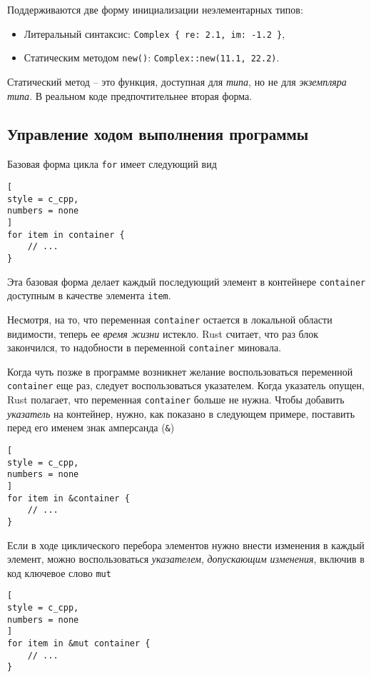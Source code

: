 \documentclass[%
	11pt,
	a4paper,
	utf8,
		]{article}
\begin{document}
Поддерживаются две форму инициализации неэлементарных типов:
\begin{itemize}
	\item Литеральный синтаксис: \verb|Complex { re: 2.1, im: -1.2 }|,
	
	\item Статическим методом \verb|new()|: \verb|Complex::new(11.1, 22.2)|.
\end{itemize}

Статический метод -- это функция, доступная для \emph{типа}, но не для \emph{экземпляра типа}. В реальном коде предпочтительнее вторая форма.

\subsection{Управление ходом выполнения программы}

Базовая форма цикла \texttt{for} имеет следующий вид
\begin{lstlisting}[
style = c_cpp,
numbers = none
]
for item in container {
    // ...
}
\end{lstlisting}

Эта базовая форма делает каждый последующий элемент в контейнере \texttt{container} доступным в качестве элемента \texttt{item}.

Несмотря, на то, что переменная \texttt{container} остается в локальной области видимости, теперь ее \emph{время жизни} истекло. Rust считает, что раз блок закончился, то надобности в переменной \texttt{container} миновала.

Когда чуть позже в программе возникнет желание воспользоваться переменной \texttt{container} еще раз, следует воспользоваться указателем. Когда указатель опущен, Rust полагает, что переменная \texttt{container} больше не нужна. Чтобы добавить \emph{указатель} на контейнер, нужно, как показано в следующем примере, поставить перед его именем знак амперсанда (\verb|&|)
\begin{lstlisting}[
style = c_cpp,
numbers = none
]
for item in &container {
    // ...
}
\end{lstlisting}

Если в ходе циклического перебора элементов нужно внести изменения в каждый элемент, можно воспользоваться \emph{указателем}, \emph{допускающим изменения}, включив в код ключевое слово \texttt{mut}
\begin{lstlisting}[
style = c_cpp,
numbers = none
]
for item in &mut container {
    // ...
}
\end{lstlisting}
\end{document}
